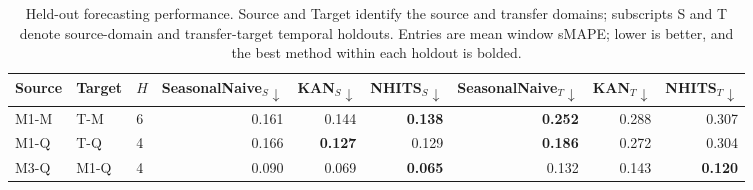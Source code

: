 \begin{table}[t]
\centering
\scriptsize
\setlength{\tabcolsep}{2pt}
\renewcommand{\arraystretch}{0.90}
\caption{Held-out forecasting performance. Source and Target identify the source and transfer domains; subscripts S and T denote source-domain and transfer-target temporal holdouts. Entries are mean window sMAPE; lower is better, and the best method within each holdout is bolded.}
\label{tab:forecasting-performance}
\begin{tabular}{@{}lllrrrrrr@{}}
\toprule
Source & Target & $H$ & SeasonalNaive$_S\downarrow$ & KAN$_S\downarrow$ & NHITS$_S\downarrow$ & SeasonalNaive$_T\downarrow$ & KAN$_T\downarrow$ & NHITS$_T\downarrow$ \\
\midrule
M1-M & T-M & 6 & 0.161 & 0.144 & \textbf{0.138} & \textbf{0.252} & 0.288 & 0.307 \\
M1-Q & T-Q & 4 & 0.166 & \textbf{0.127} & 0.129 & \textbf{0.186} & 0.272 & 0.304 \\
M3-Q & M1-Q & 4 & 0.090 & 0.069 & \textbf{0.065} & 0.132 & 0.143 & \textbf{0.120} \\
\bottomrule
\end{tabular}
\end{table}
